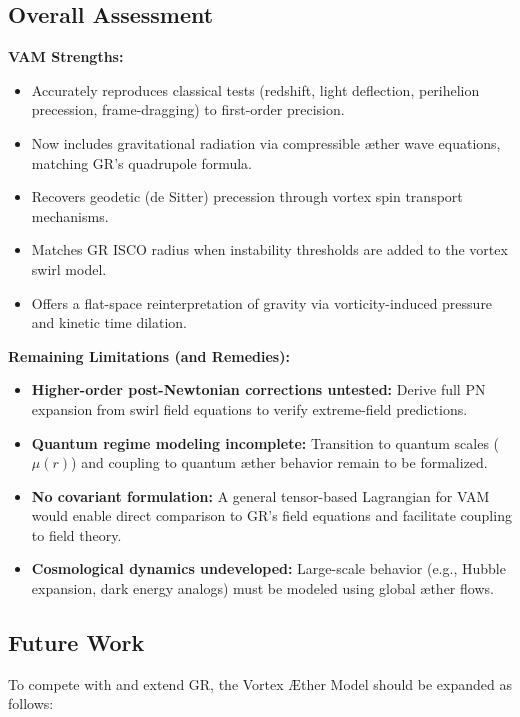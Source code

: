 \vspace{1em}

\subsection*{Overall Assessment}

\textbf{VAM Strengths:}
\begin{itemize}
    \item Accurately reproduces classical tests (redshift, light deflection, perihelion precession, frame-dragging) to first-order precision.
    \item Now includes gravitational radiation via compressible æther wave equations, matching GR's quadrupole formula.
    \item Recovers geodetic (de Sitter) precession through vortex spin transport mechanisms.
    \item Matches GR ISCO radius when instability thresholds are added to the vortex swirl model.
    \item Offers a flat-space reinterpretation of gravity via vorticity-induced pressure and kinetic time dilation.
\end{itemize}

\textbf{Remaining Limitations (and Remedies):}
\begin{itemize}
    \item \textbf{Higher-order post-Newtonian corrections untested:} Derive full PN expansion from swirl field equations to verify extreme-field predictions.
    \item \textbf{Quantum regime modeling incomplete:} Transition to quantum scales (\( \mu(r) \)) and coupling to quantum æther behavior remain to be formalized.
    \item \textbf{No covariant formulation:} A general tensor-based Lagrangian for VAM would enable direct comparison to GR's field equations and facilitate coupling to field theory.
    \item \textbf{Cosmological dynamics undeveloped:} Large-scale behavior (e.g., Hubble expansion, dark energy analogs) must be modeled using global æther flows.
\end{itemize}

\subsection*{Future Work}

To compete with and extend GR, the Vortex Æther Model should be expanded as follows:

